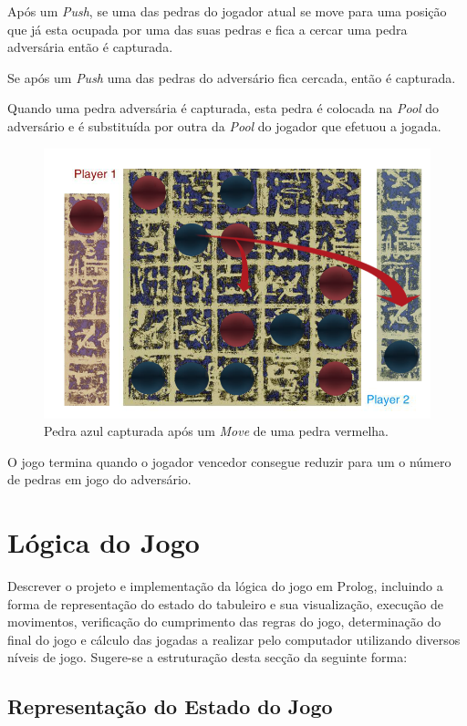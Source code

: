 \documentclass[a4paper]{article}
\begin{document}
Após um \textit{Push}, se uma das pedras do jogador atual se move para uma posição que já esta ocupada por uma das suas pedras e fica a cercar uma pedra adversária então é capturada.

Se após um \textit{Push} uma das pedras do adversário fica cercada, então é capturada.

Quando uma pedra adversária é capturada, esta pedra é colocada na \textit{Pool} do adversário e é substituída por outra da \textit{Pool} do jogador que efetuou a jogada.

\begin{figure}[!htb]
	\centering
	\includegraphics[scale=0.3]{images/move_cap.png} 
	\caption{Pedra azul capturada após um \textit{Move} de uma pedra vermelha.} %
\end{figure}

O jogo termina quando o jogador vencedor consegue reduzir para um o número de pedras em jogo do adversário.

\section{Lógica do Jogo}

Descrever o projeto e implementação da lógica do jogo em Prolog, incluindo a forma de representação do estado do tabuleiro e sua visualização, execução de movimentos, verificação do cumprimento das regras do jogo, determinação do final do jogo e cálculo das jogadas a realizar pelo computador utilizando diversos níveis de jogo. Sugere-se a estruturação desta secção da seguinte forma:

\subsection{Representação do Estado do Jogo}
\end{document}

